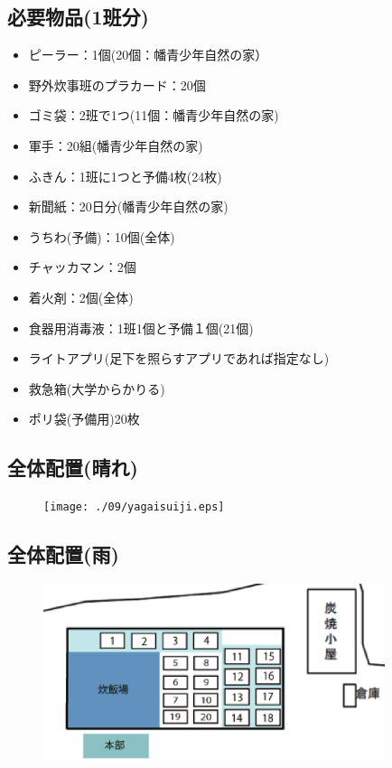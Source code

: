 \subsection{必要物品(1班分)}
\begin{itemize}
  \item ピーラー：1個(20個：幡青少年自然の家）
  \item 野外炊事班のプラカード：20個
  \item ゴミ袋：2班で1つ(11個：幡青少年自然の家)
  \item 軍手：20組(幡青少年自然の家)
  \item ふきん：1班に1つと予備4枚(24枚)　
  \item 新聞紙：20日分(幡青少年自然の家)
  \item うちわ(予備)：10個(全体)
  \item チャッカマン：2個
  \item 着火剤：2個(全体)
  \item 食器用消毒液：1班1個と予備１個(21個)
  \item ライトアプリ(足下を照らすアプリであれば指定なし)
  \item 救急箱(大学からかりる)
  \item ポリ袋(予備用)20枚
  \end{itemize}

\subsection{全体配置(晴れ)}
\begin{figure}[h]
\begin{center}
\texttt{[image: ./09/yagaisuiji.eps]}
\end{center}
\end{figure}

\subsection{全体配置(雨)}
\begin{figure}[h]
\begin{center}
\includegraphics[width = 10cm]{./09/yagaisuijirain.eps}
\end{center}
\end{figure}


